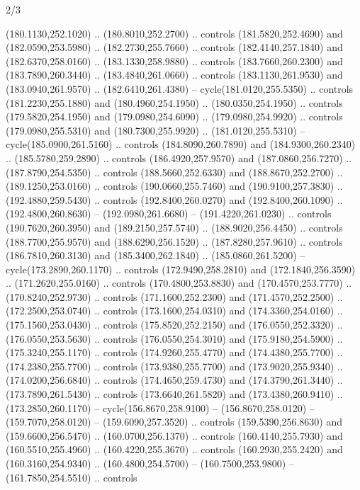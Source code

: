 \begin{flagdescription}{2/3}
\begin{scope}[xshift=0.5\flaglength,yshift=0.5\flagwidth,scale=\stretchfactor]
\begin{scope}[scale=0.001645\flagwidth,yshift=65mm,xshift=-63mm]
\begin{scope}[y=0.80pt, x=0.80pt, yscale=-1,]
\begin{scope}[cm={{1.33333,0.0,0.0,1.33333,(0.0,1e-05)}}]
  (180.1130,252.1020) .. (180.8010,252.2700) .. controls (181.5820,252.4690) and
  (182.0590,253.5980) .. (182.2730,255.7660) .. controls (182.4140,257.1840) and
  (182.6370,258.0160) .. (183.1330,258.9880) .. controls (183.7660,260.2300) and
  (183.7890,260.3440) .. (183.4840,261.0660) .. controls (183.1130,261.9530) and
  (183.0940,261.9570) .. (182.6410,261.4380) -- cycle(181.0120,255.5350) ..
  controls (181.2230,255.1880) and (180.4960,254.1950) .. (180.0350,254.1950) ..
  controls (179.5820,254.1950) and (179.0980,254.6090) .. (179.0980,254.9920) ..
  controls (179.0980,255.5310) and (180.7300,255.9920) .. (181.0120,255.5310) --
  cycle(185.0900,261.5160) .. controls (184.8090,260.7890) and
  (184.9300,260.2340) .. (185.5780,259.2890) .. controls (186.4920,257.9570) and
  (187.0860,256.7270) .. (187.8790,254.5350) .. controls (188.5660,252.6330) and
  (188.8670,252.2700) .. (189.1250,253.0160) .. controls (190.0660,255.7460) and
  (190.9100,257.3830) .. (192.4880,259.5430) .. controls (192.8400,260.0270) and
  (192.8400,260.1090) .. (192.4800,260.8630) -- (192.0980,261.6680) --
  (191.4220,261.0230) .. controls (190.7620,260.3950) and (189.2150,257.5740) ..
  (188.9020,256.4450) .. controls (188.7700,255.9570) and (188.6290,256.1520) ..
  (187.8280,257.9610) .. controls (186.7810,260.3130) and (185.3400,262.1840) ..
  (185.0860,261.5200) -- cycle(173.2890,260.1170) .. controls
  (172.9490,258.2810) and (172.1840,256.3590) .. (171.2620,255.0160) .. controls
  (170.4800,253.8830) and (170.4570,253.7770) .. (170.8240,252.9730) .. controls
  (171.1600,252.2300) and (171.4570,252.2500) .. (172.2500,253.0740) .. controls
  (173.1600,254.0310) and (174.3360,254.0160) .. (175.1560,253.0430) .. controls
  (175.8520,252.2150) and (176.0550,252.3320) .. (176.0550,253.5630) .. controls
  (176.0550,254.3010) and (175.9180,254.5900) .. (175.3240,255.1170) .. controls
  (174.9260,255.4770) and (174.4380,255.7700) .. (174.2380,255.7700) .. controls
  (173.9380,255.7700) and (173.9020,255.9340) .. (174.0200,256.6840) .. controls
  (174.4650,259.4730) and (174.3790,261.3440) .. (173.7890,261.5430) .. controls
  (173.6640,261.5820) and (173.4380,260.9410) .. (173.2850,260.1170) --
  cycle(156.8670,258.9100) -- (156.8670,258.0120) -- (159.7070,258.0120) --
  (159.6090,257.3520) .. controls (159.5390,256.8630) and (159.6600,256.5470) ..
  (160.0700,256.1370) .. controls (160.4140,255.7930) and (160.5510,255.4960) ..
  (160.4220,255.3670) .. controls (160.2930,255.2420) and (160.3160,254.9340) ..
  (160.4800,254.5700) -- (160.7500,253.9800) -- (161.7850,254.5510) .. controls

\end{scope}
\end{scope}
\end{scope}
\end{scope}
\end{flagdescription}

